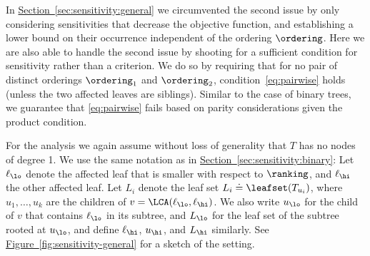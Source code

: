 \documentclass[11pt]{article}
\numberwithin{equation}{section}
\theoremstyle{definition}
\theoremstyle{plain}
\newcommand{\expref}[2]{\hyperref[#2]{#1~\ref{#2}}}
\begin{document}
In \expref{Section}{sec:sensitivity:general} we circumvented the second issue by only considering sensitivities that decrease the objective function, and establishing a lower bound on their occurrence independent of the ordering $\ordering$. Here we are also able to handle the second issue by shooting for a sufficient condition for sensitivity rather than a criterion. We do so by requiring that for no pair of distinct orderings $\ordering_1$ and $\ordering_2$, condition~\eqref{eq:pairwise} holds (unless the two affected leaves are siblings). Similar to the case of binary trees, we guarantee that \eqref{eq:pairwise} fails based on parity considerations given the product condition. 

For the analysis we again assume without loss of generality that $T$ has no nodes of degree 1. We use the same notation as in \expref{Section}{sec:sensitivity:binary}: Let  $\ell_\lo$ denote the affected leaf that is smaller with respect to $\ranking$, and $\ell_\hi$ the other affected leaf. Let $L_i$ denote the leaf set $L_i \doteq \leafset(T_{u_i})$, where $u_1, \dots, u_k$ are the children of $v = \LCA(\ell_\lo,\ell_\hi)$. We also write $u_\lo$ for the child of $v$ that contains $\ell_\lo$ in its subtree, and $L_\lo$ for the leaf set of the subtree rooted at $u_\lo$, and define $\ell_\hi$, $u_\hi$, and $L_\hi$ similarly. See \expref{Figure}{fig:sensitivity-general} for a sketch of the setting.
\end{document}
